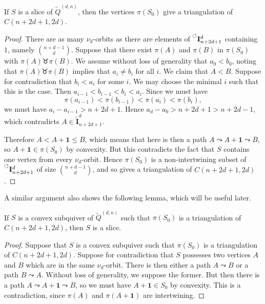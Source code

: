 \documentclass[ALCO,Unicode,published]{cedram}
\newcommand{\nonconsec}[2]{\prescript{\circlearrowleft}{}{\mathbf{I}_{#1}^{#2}}}
\newcommand{\derset}[2]{{\tilde{\mathbf{I}}_{#1}^{#2}}}
\newcommand{\onevec}{\mathbf{1}} %
\newcommand{\tqdn}{\tilde{Q}^{(d, n)}}
\newcommand{\swr}{\taurus} %
\begin{document}
\begin{prop}\label{prop:slice->triang}
If $S$ is a slice of $\tqdn$, then the vertices $\pi(S_{0})$ give a triangulation of $C(n + 2d + 1, 2d)$.
\end{prop}
\begin{proof}
There are as many $\nu_{d}$-orbits as there are elements of $\nonconsec{n + 2d + 1}{d}$ containing $1$, namely $\binom{n + d - 1}{d}$. Suppose that there exist $\pi(A)$ and $\pi(B)$ in $\pi(S_{0})$ with $\pi(A) \swr \pi(B)$. We assume without loss of generality that $a_{0} < b_{0}$, noting that $\pi(A) \swr \pi(B)$ implies that $a_{i} \neq b_{i}$ for all $i$. We claim that $A < B$. Suppose for contradiction that $b_{i} < a_{i}$ for some $i$. We may choose the minimal $i$ such that this is the case. Then $a_{i - 1} < b_{i - 1} < b_{i} < a_{i}$. Since we must have \[\pi(a_{i - 1}) < \pi(b_{i - 1}) < \pi(a_{i}) < \pi(b_{i}),\] we must have $a_{i} - a_{i - 1} > n + 2d + 1$. Hence $a_{d} - a_{0} > n + 2d + 1 > n + 2d - 1$, which contradicts $A \in \derset{n + 2d + 1}{d}$.

Therefore $A < A + \onevec \leqslant B$, which means that here is then a path $A \leadsto A + \onevec \leadsto B$, so $A + \onevec \in \pi(S_{0})$ by convexity. But this contradicts the fact that $S$ contains one vertex from every $\nu_{d}$-orbit. Hence $\pi(S_{0})$ is a non-intertwining subset of $\nonconsec{n + 2d + 1}{d}$ of size $\binom{n + d - 1}{d}$, and so gives a triangulation of $C(n + 2d + 1, 2d)$.
\end{proof}

A similar argument also shows the following lemma, which will be useful later.

\begin{lemma}\label{lem:conv->slice}
If $S$ is a convex subquiver of $\tqdn$ such that $\pi(S_{0})$ is a triangulation of $C(n+2d+1,2d)$, then $S$ is a slice. 
\end{lemma}
\begin{proof}
Suppose that $S$ is a convex subquiver such that $\pi(S_{0})$ is a triangulation of $C(n + 2d + 1, 2d)$. Suppose for contradiction that $S$ possesses two vertices $A$ and $B$ which are in the same $\nu_{d}$-orbit. There is then either a path $A \leadsto B$ or a path $B \leadsto A$. Without loss of generality, we suppose the former. But then there is a path $A \leadsto A + \onevec \leadsto B$, so we must have $A + \onevec \in S_{0}$ by convexity. This is a contradiction, since $\pi(A)$ and $\pi(A + \onevec)$ are intertwining.
\end{proof}
\end{document}
